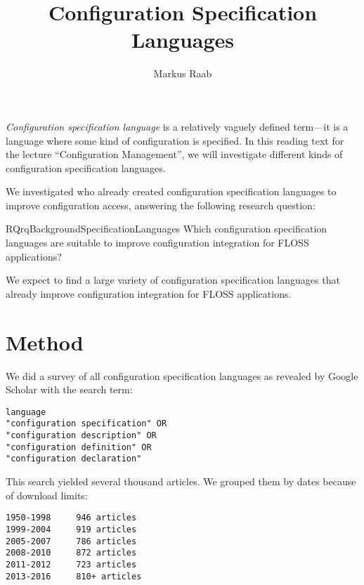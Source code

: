



\setcounter{chapter}{1} %


\title{Configuration Specification Languages}
\author{Markus Raab}




\begin{titlingpage}
\maketitle
\doclicenseThis
\end{titlingpage}

\textit{Configuration specification language}
is a relatively vaguely defined term---it is a language where some kind of configuration is specified.
In this reading text for the lecture ``Configuration Management'', we will investigate different kinds of configuration specification languages.

We investigated who already created configuration specification languages to improve configuration access, answering the following research question:
\begin{restatable}{RQ}{rqBackgroundSpecificationLanguages}
 \label{rq:background-specification-languages}
 Which configuration specification languages are suitable to improve configuration integration for FLOSS applications?
\end{restatable}

\begin{hypothesis}
We expect to find a large variety of configuration specification languages that already improve configuration integration for FLOSS applications.
\end{hypothesis}

\section{Method}

We did a survey of all configuration specification languages as revealed by Google Scholar with the search term:
\begin{verbatim}
language
"configuration specification" OR
"configuration description" OR
"configuration definition" OR
"configuration declaration"
\end{verbatim}

This search yielded several thousand articles.
We grouped them by dates because of download limits:
\begin{verbatim}
1950-1998     946 articles
1999-2004     919 articles
2005-2007     786 articles
2008-2010     872 articles
2011-2012     723 articles
2013-2016     810+ articles
\end{verbatim}

